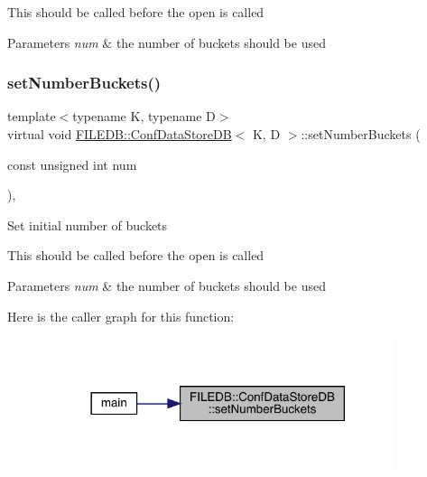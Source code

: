 This should be called before the open is called


\begin{DoxyParams}{Parameters}
{\em num} & the number of buckets should be used \\
\hline
\end{DoxyParams}
\mbox{\label{classFILEDB_1_1ConfDataStoreDB_a20a5d092cdcfbca4dbce15b2da006065}} 
\subsubsection{\texorpdfstring{setNumberBuckets()}{setNumberBuckets()}\hspace{0.1cm}{\footnotesize\ttfamily [2/2]}}
{\footnotesize\ttfamily template$<$typename K, typename D$>$ \\
virtual void \mbox{\hyperlink{classFILEDB_1_1ConfDataStoreDB}{F\+I\+L\+E\+D\+B\+::\+Conf\+Data\+Store\+DB}}$<$ K, D $>$\+::set\+Number\+Buckets (\begin{DoxyParamCaption}\item[{const unsigned int}]{num }\end{DoxyParamCaption})\hspace{0.3cm}{\ttfamily [inline]}, {\ttfamily [virtual]}}

Set initial number of buckets

This should be called before the open is called


\begin{DoxyParams}{Parameters}
{\em num} & the number of buckets should be used \\
\hline
\end{DoxyParams}
Here is the caller graph for this function\+:\nopagebreak
\begin{figure}[H]
\begin{center}
\leavevmode
\includegraphics[width=290pt]{d8/d19/classFILEDB_1_1ConfDataStoreDB_a20a5d092cdcfbca4dbce15b2da006065_icgraph}
\end{center}
\end{figure}
\mbox{\label{classFILEDB_1_1ConfDataStoreDB_a50004cb93881959d0846a12d920a95c8}} 
